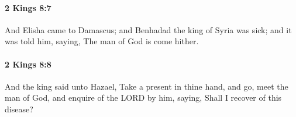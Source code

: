 		\paragraph{2 Kings 8:7} %
			\label{2KINGS-8-7}

			And Elisha came to Damascus; and Benhadad the king of Syria was sick; and it was told him, saying, The man of God is come hither.


		\paragraph{2 Kings 8:8} %
			\label{2KINGS-8-8}

			And the king said unto Hazael, Take a present in thine hand, and go, meet the man of God, and enquire of the LORD by him, saying, Shall I recover of this disease?


